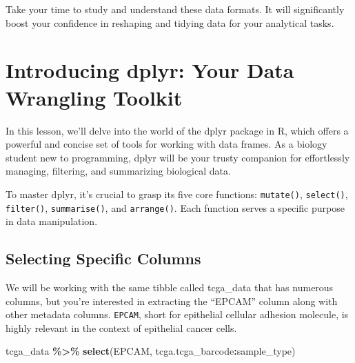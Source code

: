 \documentclass[
]{book}
\newenvironment{Shaded}{\begin{snugshade}}{\end{snugshade}}
\newcommand{\FunctionTok}[1]{\textcolor[rgb]{0.13,0.29,0.53}{\textbf{#1}}}
\newcommand{\NormalTok}[1]{#1}
\newcommand{\SpecialCharTok}[1]{\textcolor[rgb]{0.81,0.36,0.00}{\textbf{#1}}}
\begin{document}
Take your time to study and understand these data formats. It will significantly boost your confidence in reshaping and tidying data for your analytical tasks.

\hypertarget{introducing-dplyr-your-data-wrangling-toolkit}{%
\section{Introducing dplyr: Your Data Wrangling Toolkit}\label{introducing-dplyr-your-data-wrangling-toolkit}}

In this lesson, we'll delve into the world of the dplyr package in R, which offers a powerful and concise set of tools for working with data frames. As a biology student new to programming, dplyr will be your trusty companion for effortlessly managing, filtering, and summarizing biological data.

To master dplyr, it's crucial to grasp its five core functions: \texttt{mutate()}, \texttt{select()}, \texttt{filter()}, \texttt{summarise()}, and \texttt{arrange()}. Each function serves a specific purpose in data manipulation.

\hypertarget{selecting-specific-columns}{%
\subsection{Selecting Specific Columns}\label{selecting-specific-columns}}

We will be working with the same tibble called tcga\_data that has numerous columns, but you're interested in extracting the ``EPCAM'' column along with other metadata columns. \texttt{EPCAM}, short for epithelial cellular adhesion molecule, is highly relevant in the context of epithelial cancer cells.

\begin{Shaded}
\begin{Highlighting}[]
\NormalTok{tcga\_data }\SpecialCharTok{\%\textgreater{}\%}
  \FunctionTok{select}\NormalTok{(EPCAM, tcga.tcga\_barcode}\SpecialCharTok{:}\NormalTok{sample\_type)}
\end{Highlighting}
\end{Shaded}
\end{document}
